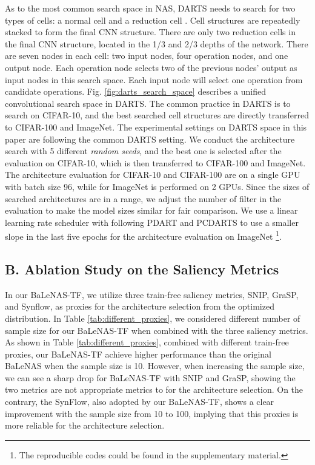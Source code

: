 \documentclass[10pt,twocolumn,letterpaper]{article}
\begin{document}
As to the most common search space in NAS, DARTS needs to search for two types of cells: a normal cell  and a reduction cell . Cell structures are repeatedly stacked to form the final CNN structure. There are only two reduction cells in the final CNN structure, located in the 1/3 and 2/3 depths of the network. There are seven nodes in each cell: two input nodes, four operation nodes, and one output node. Each operation node selects two of the previous nodes' output as input nodes in this search space. Each input node will select one operation from  candidate operations. Fig. \ref{fig:darts_search_space} describes a unified convolutional search space in DARTS. The common practice in DARTS is to search on CIFAR-10, and the best searched cell structures are directly transferred to CIFAR-100 and ImageNet. The experimental settings on DARTS space in this paper are following the common DARTS setting. We conduct the architecture search with 5 different \textit{random seeds}, and the best one is selected after the evaluation on CIFAR-10, which is then transferred to CIFAR-100 and ImageNet. The architecture evaluation for CIFAR-10 and CIFAR-100 are on a single GPU with batch size 96, while for ImageNet is performed on 2 GPUs. Since the sizes of searched architectures are in a range, we adjust the number of filter in the evaluation to make the model sizes similar for fair comparison. We use a linear learning rate scheduler with following PDART \cite{chen2019progressive} and PCDARTS \cite{xu2019pcdarts} to use a smaller slope in the last five epochs for the architecture evaluation on ImageNet \footnote{The reproducible codes could be found in the supplementary material. }.









\subsection*{B. Ablation Study on the Saliency Metrics} 
In our BaLeNAS-TF, we utilize three train-free saliency metrics, SNIP, GraSP, and Synflow, as proxies for the architecture selection from the optimized distribution. In Table \ref{tab:different_proxies}, we considered different number of sample size for our BaLeNAS-TF when combined with the three saliency metrics. As shown in Table \ref{tab:different_proxies}, combined with different train-free proxies, our BaLeNAS-TF achieve higher performance than the original BaLeNAS when the sample size is 10. However, when increasing the sample size, we can see a sharp drop for BaLeNAS-TF with SNIP and GraSP, showing the two metrics are not appropriate metrics to for the architecture selection. On the contrary, the SynFlow, also adopted by our BaLeNAS-TF, shows a clear improvement with the sample size from 10 to 100, implying that this proxies is more reliable for the architecture selection.
\end{document}

